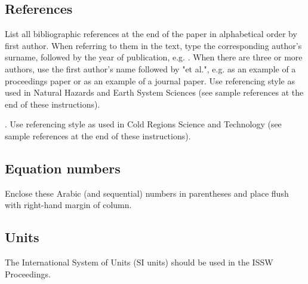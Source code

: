 \documentclass[3p,authoryear,times,twocolumn]{elsarticle_issw2018}
\begin{document}
\subsection{References}
List all bibliographic references at the end of the paper in alphabetical order by first author. When referring to them in the text, type the corresponding author's surname, followed by the year of publication, e.g. \cite{McClung2006}. When there are three or more authors, use the first author's name followed by "et al.", e.g. \cite{Greene2006} as an example of a proceedings paper or \cite{Fisher2022} as an example of a journal paper. Use referencing style as used in Natural Hazards and Earth System Sciences (see sample references at the end of these instructions).

. Use referencing style as used in Cold Regions Science and Technology (see sample references at the end of these instructions).
%
\subsection{Equation numbers}
Enclose these Arabic (and sequential) numbers in parentheses and place flush with right-hand margin of column.
%
\subsection{Units}
The International System of Units (SI units) should be used in the ISSW Proceedings.
%
\end{document}
